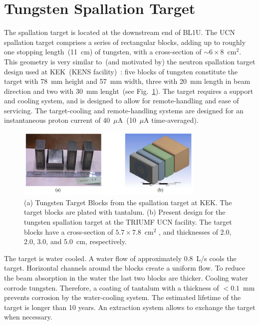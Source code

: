 \section{Tungsten Spallation Target\label{sec:target}}
The spallation target is located at the downstream end of BL1U. The
UCN spallation target comprises a series of rectangular blocks, adding
up to roughly one stopping length~(11~cm) of tungsten, with a
cross-section of $\sim6 \times 8$~cm$^2$. This geometry is very
similar to~(and motivated by) the neutron spallation target design
used at KEK~(KENS facility)~\cite{kawai2001fabrication}: five blocks
of tungsten constitute the target with 78~mm height and 57~mm width,
three with 20~mm length in beam direction and two with 30~mm
lenght~(see Fig.~\ref{fig:target}).
The target requires a support
and cooling system, and is designed to allow for remote-handling and
ease of servicing. The target-cooling and remote-handling systems are
designed for an instantaneous proton current of 40~$\mu$A~(10~$\mu$A
time-averaged).
\begin{figure}[h!]
  \centering
  \includegraphics[width=0.8\textwidth]{target.png}
  \caption{(a) Tungsten Target Blocks from the spallation target at
    KEK. The target blocks are plated with tantalum. (b) Present
    design for the tungsten spallation target at the TRIUMF UCN
    facility. The target blocks have a cross-section of
    $5.7 \times 7.8$~cm$^2$ , and thicknesses of 2.0, 2.0, 3.0, and
    5.0~cm, respectively.}
  \label{fig:target}
\end{figure}
The target is water cooled. A water flow of approximately
0.8~L/s cools the target. Horizontal channels around the blocks create
a uniform flow. To reduce the beam absorption in the water the last
two blocks are thicker. Cooling water corrode tungsten.  Therefore, a
coating of tantalum with a thickness of $< 0.1$~mm prevents corrosion
by the water-cooling system. The estimated lifetime of the target is
longer than 10 years. An extraction system allows to exchange the
target when necessary.


